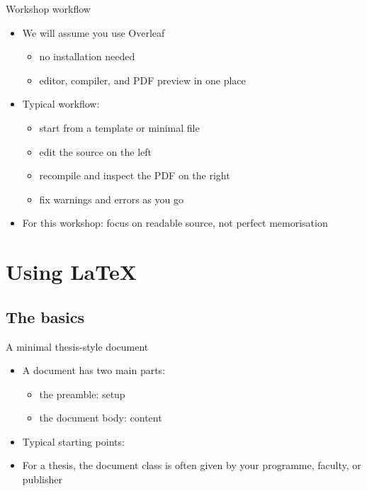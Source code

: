 \documentclass{beamer}
\begin{document}
\begin{frame}{Workshop workflow}
    \begin{itemize}
        \item We will assume you use Overleaf
              \begin{itemize}
                  \item no installation needed
                  \item editor, compiler, and PDF preview in one place
              \end{itemize}
        \item Typical workflow:
              \begin{itemize}
                  \item start from a template or minimal file
                  \item edit the source on the left
                  \item recompile and inspect the PDF on the right
                  \item fix warnings and errors as you go
              \end{itemize}
        \item For this workshop: focus on readable source, not perfect memorisation
    \end{itemize}
\end{frame}

\section{Using \LaTeX{}}

\subsection{The basics}

\begin{frame}[fragile]{A minimal thesis-style document}
    \begin{itemize}
        \item A document has two main parts:
              \begin{itemize}
                  \item the preamble: setup
                  \item the document body: content
              \end{itemize}
        \item Typical starting points:
        \item For a thesis, the document class is often given by your programme,
              faculty, or publisher
    \end{itemize}
\end{frame}
\end{document}
